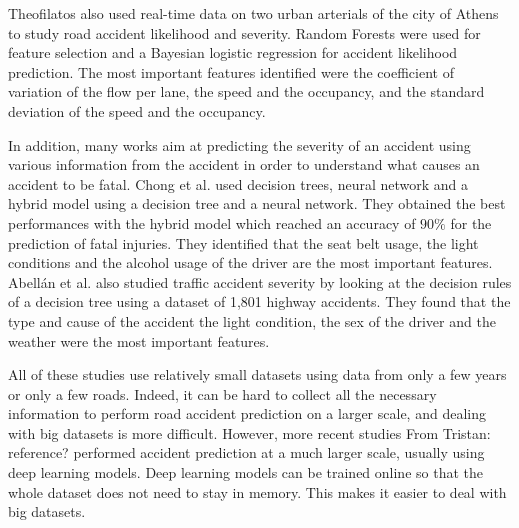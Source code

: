 \documentclass[conference]{IEEEtran}
\newcommand{\TG}[1]{\colorlet{saved}{.}\color{orange}From Tristan: #1\color{saved}}
\begin{document}
Theofilatos\cite{Theofilatos2017} also used
real-time data on two urban arterials of the city of Athens to study road
accident likelihood and severity. Random Forests were used for feature
selection and a Bayesian logistic regression for accident likelihood
prediction. The most important features identified were the coefficient of
variation of the flow per lane, the speed and the occupancy, and the
standard deviation of the speed and the occupancy. 

In addition, many
works aim at predicting the severity of an accident using various
information from the accident in order to understand what causes an
accident to be fatal. Chong et al.\cite{Chong2005} used decision trees,
neural network and a hybrid model using a decision tree and a neural
network. They obtained the best performances with the hybrid model which
reached an accuracy of $90\%$ for the prediction of fatal injuries. They
identified that the seat belt usage, the light conditions and the alcohol
usage of the driver are the most important features. Abellán et al.
\cite{Abellan2013} also studied traffic accident severity by looking at the
decision rules of a decision tree using a dataset of 1,801 highway
accidents. They found that the type and cause of the accident the light
condition, the sex of the driver and the weather were the most important
features.

All of these studies use relatively small datasets using data from only a
few years or only a few roads. Indeed, it can be hard to collect all the
necessary information to perform road accident prediction on a larger
scale, and dealing with big datasets is more difficult. However, more
recent studies \TG{reference?} performed accident prediction at a much larger scale,
usually using deep learning models. Deep learning models can be trained
online so that the whole dataset does not need to stay in memory. This
makes it easier to deal with big datasets.
\end{document}
